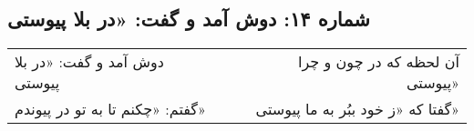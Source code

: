 \begin{center}
\section*{شماره ۱۴: دوش آمد و گفت: «در بلا پیوستی}
\label{sec:014}
\begin{longtable}{l p{0.5cm} r}
دوش آمد و گفت: «در بلا پیوستی
&&
آن لحظه که در چون و چرا پیوستی»
\\
گفتم: «چکنم تا به تو در پیوندم»
&&
گفتا که «ز خود ببُر به ما پیوستی»
\\
\end{longtable}
\end{center}
